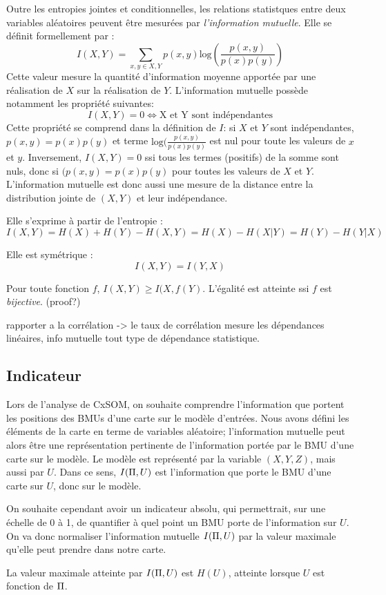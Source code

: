 Outre les entropies jointes et conditionnelles, les relations statistques entre deux variables aléatoires peuvent être mesurées par \emph{l'information mutuelle}. Elle se définit formellement par : 
$$ I(X,Y) = \sum_{x,y \in X,Y}{p(x,y)\textrm{log}(\frac{p(x,y)}{p(x)p(y)})}$$
Cette valeur mesure la quantité d'information moyenne apportée par une réalisation de $X$ sur la réalisation de $Y$. L'information mutuelle possède notamment les propriété suivantes: 
$$I(X,Y) = 0 \Leftrightarrow \textrm{X et Y sont indépendantes}$$
Cette propriété se comprend dans la définition de $I$: si $X$ et $Y$ sont indépendantes, $p(x,y)=p(x)p(y)$ et terme $\textrm{log}(\frac{p(x,y)}{p(x)p(y)}$ est nul pour toute les valeurs de $x$ et $y$. Inversement, $I(X,Y) =0$ ssi tous les termes (positifs) de la somme sont nuls, donc si $(p(x,y)=p(x)p(y)$ pour toutes les valeurs de $X$ et $Y$. L'information mutuelle est donc aussi une mesure de la distance entre la distribution jointe de $(X,Y)$ et leur indépendance.


Elle s'exprime à partir de l'entropie : $$I(X,Y) = H(X) + H(Y) - H(X,Y) = H(X) - H(X|Y) = H(Y) - H(Y|X)$$

Elle est symétrique : $$I(X,Y) = I(Y,X)$$

Pour toute fonction $f$, $I(X,Y) \geq I(X,f(Y)$. L'égalité est atteinte ssi $f$ est \emph{bijective}. (proof?)

rapporter a la corrélation -> le taux de corrélation mesure les dépendances linéaires, info mutuelle tout type de dépendance statistique.

\subsection{Indicateur}

Lors de l'analyse de CxSOM, on souhaite comprendre l'information que portent les positions des BMUs d'une carte sur le modèle d'entrées. Nous avons défini les éléments de la carte en terme de variables aléatoire; l'information mutuelle peut alors être une représentation pertinente de l'information portée par le BMU d'une carte sur le modèle. Le modèle est représenté par la variable $(X,Y,Z)$, mais aussi par $U$. Dans ce sens, $I(\Pi, U)$ est l'information que porte le BMU d'une carte sur $U$, donc sur le modèle. 

On souhaite cependant avoir un indicateur absolu, qui permettrait, sur une échelle de 0 à 1, de quantifier à quel point un BMU porte de l'information sur $U$. On va donc normaliser l'information mutuelle $I(\Pi,U)$ par la valeur maximale qu'elle peut prendre dans notre carte.
\begin{propriete}
La valeur maximale atteinte par $I(\Pi,U)$ est $H(U)$, atteinte lorsque $U$ est fonction de $\Pi$.
\end{propriete}

